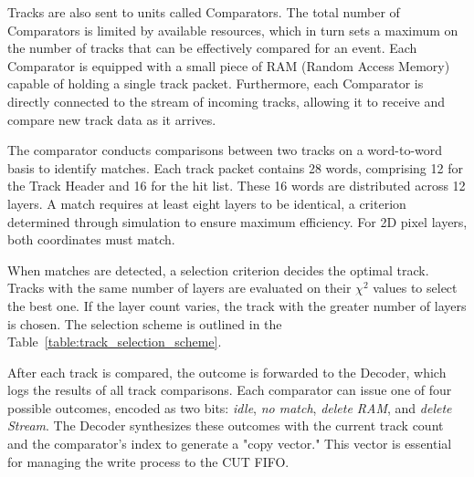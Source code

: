 Tracks are also sent to units called Comparators. The total number of Comparators is limited by available resources, which in turn sets a maximum on the number of tracks that can be effectively compared for an event. Each Comparator is equipped with a small piece of RAM (Random Access Memory) capable of holding a single track packet. Furthermore, each Comparator is directly connected to the stream of incoming tracks, allowing it to receive and compare new track data as it arrives.

The comparator conducts comparisons between two tracks on a word-to-word basis to identify matches. Each track packet contains 28 words, comprising 12 for the Track Header and 16 for the hit list. These 16 words are distributed across 12 layers. A match requires at least eight layers to be identical, a criterion determined through simulation to ensure maximum efficiency. For 2D pixel layers, both coordinates must match.

When matches are detected, a selection criterion decides the optimal track. Tracks with the same number of layers are evaluated on their \(\chi^2\) values to select the best one. If the layer count varies, the track with the greater number of layers is chosen. The selection scheme is outlined in the Table~\ref{table:track_selection_scheme}.

\begin{table}[ht]
\centering
{}
\caption{Selection scheme for matching tracks.}
\label{table:track_selection_scheme}
\end{table}

After each track is compared, the outcome is forwarded to the Decoder, which logs the results of all track comparisons. Each comparator can issue one of four possible outcomes, encoded as two bits: \textit{idle}, \textit{no match}, \textit{delete RAM}, and \textit{delete Stream}. The Decoder synthesizes these outcomes with the current track count and the comparator's index to generate a "copy vector." This vector is essential for managing the write process to the CUT FIFO.

